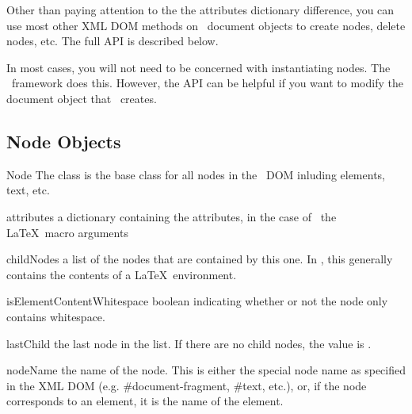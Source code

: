 Other than paying attention to the the attributes dictionary difference,
you can use most other XML DOM methods on \plasTeX\ document objects to
create nodes, delete nodes, etc.  The full API is described below.

In most cases, you will not need to be concerned with instantiating nodes.
The \plasTeX\ framework does this.  However, the API can be helpful if you
want to modify the document object that \plasTeX\ creates.


\subsection{Node Objects}

\begin{classdesc}{Node}{}
The  class is the base class for all nodes in the
\plasTeX\ DOM inluding elements, text, etc.
\end{classdesc}

\begin{memberdesc}[Node]{attributes}
a dictionary containing the attributes, in the case of \plasTeX\, the 
\LaTeX\ macro arguments
\end{memberdesc}

\begin{memberdesc}[Node]{childNodes}
a list of the nodes that are contained by this one.  In \plasTeX, this 
generally contains the contents of a \LaTeX\ environment.
\end{memberdesc}

\begin{memberdesc}[Node]{isElementContentWhitespace}
boolean indicating whether or not the node only contains whitespace.
\end{memberdesc}

\begin{memberdesc}[Node]{lastChild}
the last node in the  list.  If there are no child nodes,
the value is .
\end{memberdesc}

\begin{memberdesc}[Node]{nodeName}
the name of the node.  This is either the special node name as specified
in the XML DOM (e.g. \#document-fragment, \#text, etc.), or, if the
node corresponds to an element, it is the name of the element.
\end{memberdesc}

